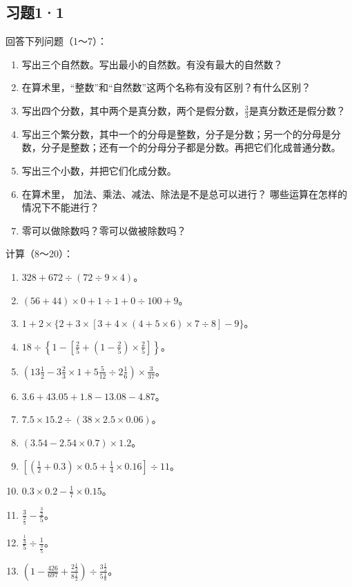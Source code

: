 \subsection{习题1·1}

回答下列问题（1～7）：

\begin{enumerate}
\item
  写出三个自然数。写出最小的自然数。有没有最大的自然数？
\item
  在算术里，``整数''和``自然数''这两个名称有没有区别？有什么区别？
\item
  写出四个分数，其中两个是真分数，两个是假分数，\(\frac{3}{3}\)是真分数还是假分数？
\item
  写出三个繁分数，其中一个的分母是整数，分子是分数；另一个的分母是分数，分子是整数；还有一个的分母分子都是分数。再把它们化成普通分数。
\item
  写出三个小数，并把它们化成分数。
\item
  在算术里， 加法、乘法、减法、除法是不是总可以进行？
  哪些运算在怎样的情况下不能进行？
\item
  零可以做除数吗？零可以做被除数吗？
\end{enumerate}

计算（8～20）：

\begin{enumerate}[start=8]
\item
  \(328+672\div(72\div9\times4)\)。
\item
  \((56+44)\times0+1\div1+0\div100+9\)。
\item
  \(1+2\times\{2+3\times[3+4\times(4+5\times6)\times7\div8]-9\}\)。
\item
  \(18 \div \left\{1 - \left[\frac{2}{5} + \left(1 - \frac{2}{5}\right) \times \frac{2}{5}\right]\right\}\)。
\item
  \(\left(13\frac{1}{2} - 3\frac{2}{3} \times 1 + 5\frac{5}{12} \div 2\frac{1}{6}\right) \times \frac{3}{37}\)。
\item
  \(3.6 + 43.05 + 1.8 - 13.08 - 4.87\)。
\item
  \(7.5 \times 15.2 \div (38 \times 2.5 \times 0.06)\)。
\item
  \((3.54 - 2.54 \times 0.7) \times 1.2\)。
\item
  \(\left[\left(\frac{1}{2} + 0.3\right) \times 0.5 + \frac{1}{4} \times 0.16\right] \div 11\)。
\item
  \(0.3 \times 0.2 - \frac{1}{7} \times 0.15\)。
\item
  \(\frac{3}{\frac{2}{5}} - \frac{\frac{3}{2}}{5}\)。
\item
  \(\frac{\frac{1}{3}}{5} \div \frac{1}{\frac{3}{5}}\)。
\item
  \(\left(1 - \frac{426}{697} + \frac{2\frac{1}{2}}{8\frac{1}{2}}\right) \div \frac{3\frac{1}{2}}{5\frac{1}{8}}\)。
\end{enumerate}

